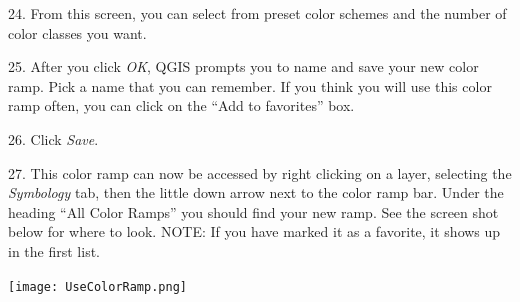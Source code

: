\documentclass[oneside,a4paper,11pt,explicit]{book}
\begin{document}
\vspace{.5em}

24. From this screen, you can select from preset color schemes and the number of color classes you want.

25. After you click \textit{OK}, QGIS prompts you to name and save your new color ramp. Pick a name that you can remember. If you think you will use this color ramp often, you can click on the ``Add to favorites'' box. 

26. Click \textit{Save}.

27. This color ramp can now be accessed by right clicking on a layer, selecting the \textit{Symbology} tab, then the little down arrow next to the color ramp bar. Under the heading ``All Color Ramps'' you should find your new ramp. See the screen shot below for where to look. NOTE: If you have marked it as a favorite, it shows up in the first list. 

\centerline{\texttt{[image: UseColorRamp.png]}}

\vspace{.5em}
\end{document}
